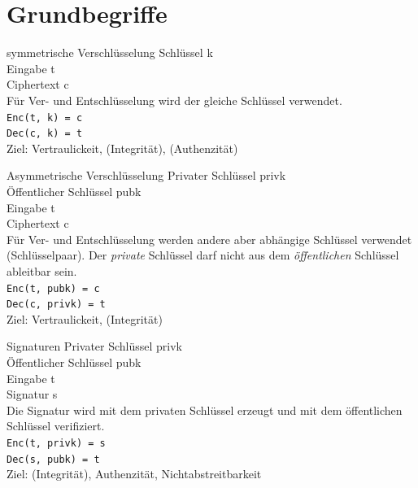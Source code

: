 \documentclass[10pt]{beamer}
\begin{document}
	\section{Grundbegriffe}
	
	\begin{frame}{symmetrische Verschlüsselung}
		\alert{Schlüssel} k\\
		\alert{Eingabe} t\\
		\alert{Ciphertext} c\\
		\vspace{0.5cm}
		Für Ver- und Entschlüsselung wird der gleiche Schlüssel verwendet.\\
		\texttt{Enc(t, k) = c}\\
		\texttt{Dec(c, k) = t}\\
		Ziel: Vertraulickeit, (Integrität), (Authenzität)
	\end{frame}
	
	\begin{frame}{Asymmetrische Verschlüsselung}
		\alert{Privater Schlüssel} privk\\
		\alert{Öffentlicher Schlüssel} pubk\\
		\alert{Eingabe} t\\
		\alert{Ciphertext} c\\
		\vspace{0.5cm}
		Für Ver- und Entschlüsselung werden andere aber abhängige Schlüssel verwendet (Schlüsselpaar).
		Der \emph{private} Schlüssel darf nicht aus dem \emph{öffentlichen} Schlüssel ableitbar sein.\\
		\texttt{Enc(t, pubk) = c}\\
		\texttt{Dec(c, privk) = t}\\
		\alert{Ziel}: Vertraulickeit, (Integrität)\\
	\end{frame}

	\begin{frame}{Signaturen}
		\alert{Privater Schlüssel} privk\\
		\alert{Öffentlicher Schlüssel} pubk\\
		\alert{Eingabe} t\\
		\alert{Signatur} s\\
		\vspace{0.5cm}
		Die Signatur wird mit dem privaten Schlüssel erzeugt und mit dem öffentlichen Schlüssel verifiziert.\\
		\texttt{Enc(t, privk) = s}\\
		\texttt{Dec(s, pubk) = t}\\
		\alert{Ziel}: (Integrität), Authenzität, Nichtabstreitbarkeit\\
	\end{frame}
\end{document}
